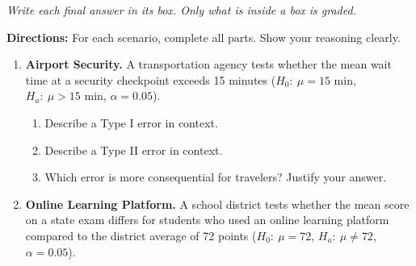 \documentclass[10pt]{article}
\begin{document}
{\small\itshape Write each final answer in its box. Only what is inside a box is graded.}\par

\vspace{0.1in}
\textbf{Directions:} For each scenario, complete all parts. Show your reasoning clearly.

\begin{enumerate}

  \item \textbf{Airport Security.} A transportation agency tests whether the mean wait
        time at a security checkpoint exceeds 15 minutes
        ($H_0{:}\ \mu = 15$ min, $H_a{:}\ \mu > 15$ min, $\alpha = 0.05$).

        \begin{enumerate}[label=\alph*.]
          \boxguard
          \item Describe a Type I error in context.
          \boxguard
          \item Describe a Type II error in context.
          \boxguard
          \item Which error is more consequential for travelers? Justify your answer.
        \end{enumerate}

  \newpage
  \item \textbf{Online Learning Platform.} A school district tests whether the mean
        score on a state exam differs for students who used an online learning platform
        compared to the district average of 72 points
        ($H_0{:}\ \mu = 72$, $H_a{:}\ \mu \ne 72$, $\alpha = 0.05$).


\end{enumerate}
\end{document}
